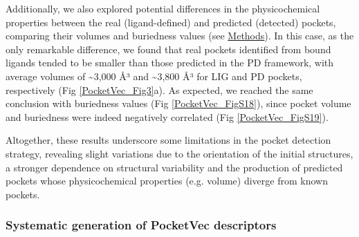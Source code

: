 Additionally, we also explored potential differences in the physicochemical properties between the real (ligand-defined) and predicted (detected) pockets, comparing their volumes and buriedness values (see \hyperref[PocketVec_Methods]{Methods}). In this case, as the only remarkable difference, we found that real pockets identified from bound ligands tended to be smaller than those predicted in the PD framework, with average volumes of \textasciitilde3,000 Å³ and \textasciitilde3,800 Å³ for LIG and PD pockets, respectively (Fig \ref{PocketVec_Fig3}a). As expected, we reached the same conclusion with buriedness values (Fig \ref{PocketVec_FigS18}), since pocket volume and buriedness were indeed negatively correlated (Fig \ref{PocketVec_FigS19}).

Altogether, these results underscore some limitations in the pocket detection strategy, revealing slight variations due to the orientation of the initial structures, a stronger dependence on structural variability and the production of predicted pockets whose physicochemical properties (e.g. volume) diverge from known pockets. 




\subsubsection{Systematic generation of PocketVec descriptors}
\label{PocketVec_ResultsAndDiscussion_Systematic_generation_of_PocketVec_descriptors}

